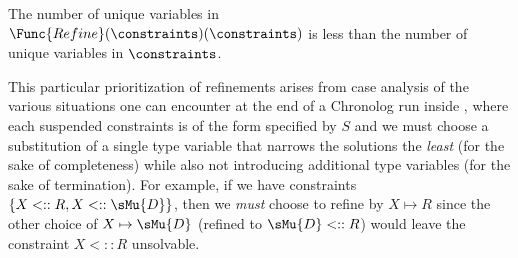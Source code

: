 \begin{lemma}
  \label{lem:refine-decreases}
  The number of unique variables in $\Func{Refine}(\constraints)(\constraints)$ is less than the number of unique variables in $\constraints$.
\end{lemma}

This particular prioritization of refinements arises from case analysis of the various situations one can encounter at the end of a Chronolog run inside , where each suspended constraints is of the form specified by $S$ and we must choose a substitution of a single type variable that narrows the solutions the \textit{least} (for the sake of completeness) while also not introducing additional type variables (for the sake of termination).
For example, if we have constraints $\{ X <:: R, X <:: \sMu{D} \}$, then we \textit{must} choose to refine by $X \mapsto R$ since the other choice of $X \mapsto \sMu{D}$ (refined to $\sMu{D} <:: R$) would leave the constraint $X <:: R$ unsolvable.

